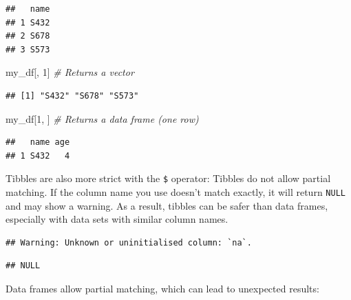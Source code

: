 \documentclass[
]{book}
\newenvironment{Shaded}{\begin{snugshade}}{\end{snugshade}}
\newcommand{\CommentTok}[1]{\textcolor[rgb]{0.56,0.35,0.01}{\textit{#1}}}
\newcommand{\DecValTok}[1]{\textcolor[rgb]{0.00,0.00,0.81}{#1}}
\newcommand{\NormalTok}[1]{#1}
\newcommand{\SpecialCharTok}[1]{\textcolor[rgb]{0.81,0.36,0.00}{\textbf{#1}}}
\begin{document}
\begin{verbatim}
##   name
## 1 S432
## 2 S678
## 3 S573
\end{verbatim}

\begin{Shaded}
\begin{Highlighting}[]
\NormalTok{my\_df[, }\DecValTok{1}\NormalTok{]    }\CommentTok{\# Returns a vector}
\end{Highlighting}
\end{Shaded}

\begin{verbatim}
## [1] "S432" "S678" "S573"
\end{verbatim}

\begin{Shaded}
\begin{Highlighting}[]
\NormalTok{my\_df[}\DecValTok{1}\NormalTok{, ]    }\CommentTok{\# Returns a data frame (one row)}
\end{Highlighting}
\end{Shaded}

\begin{verbatim}
##   name age
## 1 S432   4
\end{verbatim}

Tibbles are also more strict with the \texttt{\$} operator: Tibbles do not allow partial matching. If the column name you use doesn't match exactly, it will return \texttt{NULL} and may show a warning. As a result, tibbles can be safer than data frames, especially with data sets with similar column names.

\begin{Shaded}
\end{Shaded}

\begin{verbatim}
## Warning: Unknown or uninitialised column: `na`.
\end{verbatim}

\begin{verbatim}
## NULL
\end{verbatim}

Data frames allow partial matching, which can lead to unexpected results:

\begin{Shaded}
\end{Shaded}
\end{document}
